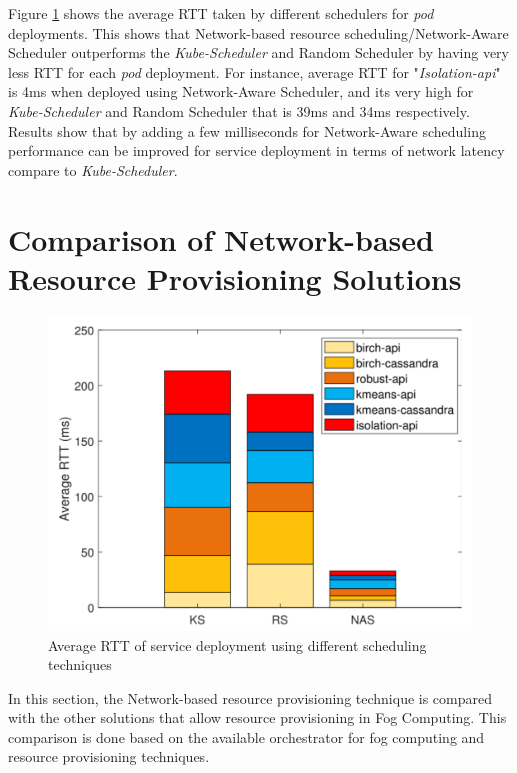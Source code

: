   Figure \ref{fig:k8s-comapre-sc} shows the average RTT taken by different schedulers for \emph{pod} deployments. This shows that Network-based resource scheduling/Network-Aware Scheduler outperforms the \emph{Kube-Scheduler} and Random Scheduler by having very less RTT for each \emph{pod} deployment\cite{Santos2019}. For instance, average RTT for "\emph{Isolation-api}" is 4ms when deployed using Network-Aware Scheduler, and its very high for \emph{Kube-Scheduler} and Random Scheduler that is 39ms and 34ms respectively\cite{Santos2019}. Results show that by adding a few milliseconds for Network-Aware scheduling performance can be improved for service deployment in terms of network latency compare to \emph{Kube-Scheduler}\cite{Santos2019}.
  \vspace{-0.5cm}
  \section{Comparison of Network-based Resource Provisioning Solutions}
  \label{sec:related_work}
  \begin{figure}
    \centering
    \includegraphics[width=\linewidth]{figures/mlcn-k8s-scheduler-compare.pdf}
    \caption{Average RTT of service deployment using different scheduling techniques\cite{Santos2019}}
    \label{fig:k8s-comapre-sc}
  \end{figure}
  In this section, the Network-based resource provisioning technique is compared with the other solutions that allow resource provisioning in Fog Computing. This comparison is done based on the available orchestrator for fog computing and resource provisioning techniques.
